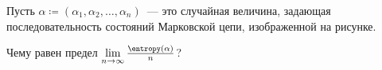 Пусть $\alpha \coloneqq (\alpha_1, \alpha_2, \dots, \alpha_n)$~--- это случайная величина, задающая
последовательность состояний Марковской цепи, изображенной на рисунке.

Чему равен предел $\lim\limits_{n \to \infty} \frac{\entropy(\alpha)}{n}$?